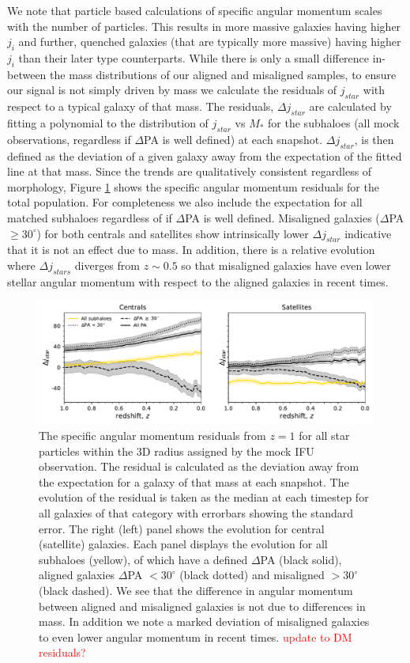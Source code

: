 \documentclass[fleqn,usenatbib]{mnras}
\newcommand{\red}[1]{{\textcolor{red}{#1}}}
\begin{document}
We note that particle based calculations of specific angular momentum scales with the number of particles. This results in more massive galaxies having higher $j_{i}$ and further, quenched galaxies (that are typically more massive) having higher $j_{i}$ than their later type counterparts. While there is only a small difference in-between the mass distributions of our aligned and misaligned samples, to ensure our signal is not simply driven by mass we calculate the residuals of $j_{star}$ with respect to a typical galaxy of that mass. The residuals, $\Delta j_{star}$ are calculated by fitting a polynomial to the distribution of $j_{star}$ vs $M_{\ast}$ for the subhaloes (all mock observations, regardless if $\Delta$PA is well defined) at each snapshot. $\Delta j_{star}$, is then defined as the deviation of a given galaxy away from the expectation of the fitted line at that mass. Since the trends are qualitatively consistent regardless of morphology, Figure \ref{fig:sJ_evo_residual} shows the specific angular momentum residuals for the total population. For completeness we also include the expectation for all matched subhaloes regardless of if $\Delta$PA is well defined. Misaligned galaxies ($\Delta$PA $\geq 30^{\circ}$) for both centrals and satellites show intrinsically lower $\Delta j_{star}$ indicative that it is not an effect due to mass. In addition, there is a relative evolution where $\Delta j_{stars}$ diverges from $z \sim 0.5$ so that misaligned galaxies have even lower stellar angular momentum with respect to the aligned galaxies in recent times.

\begin{figure}
	\includegraphics[width=\linewidth]{tng_results/delta_j_stars_residuals.pdf}
    \caption{The specific angular momentum residuals from $z=1$ for all star particles within the 3D radius assigned by the mock IFU observation. The residual is calculated as the deviation away from the expectation for a galaxy of that mass at each snapshot. The evolution of the residual is taken as the median at each timestep for all galaxies of that category with errorbars showing the standard error. The right (left) panel shows the evolution for central (satellite) galaxies. Each panel displays the evolution for all subhaloes (yellow), of which have a defined $\Delta$PA (black solid), aligned galaxies $\Delta$PA $< 30^{\circ}$ (black dotted) and misaligned $> 30^{\circ}$ (black dashed). We see that the difference in angular momentum between aligned and misaligned galaxies is not due to differences in mass. In addition we note a marked deviation of misaligned galaxies to even lower angular momentum in recent times. \red{update to DM residuals?}}
    \label{fig:sJ_evo_residual}
\end{figure}
\end{document}
